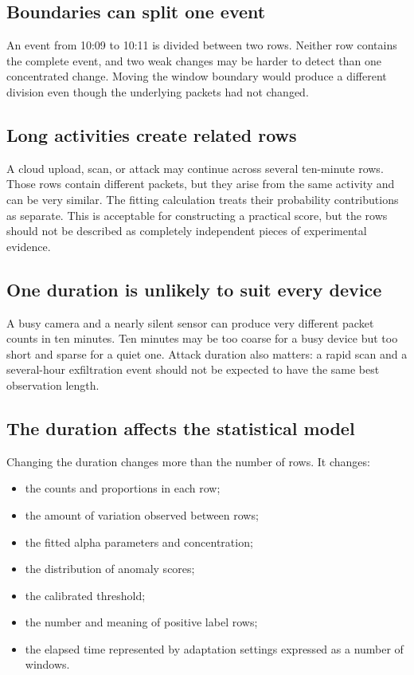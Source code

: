 \documentclass[11pt,a4paper]{article}
\begin{document}
\subsection{Boundaries can split one event}

An event from 10:09 to 10:11 is divided between two rows.  Neither row contains
the complete event, and two weak changes may be harder to detect than one
concentrated change.  Moving the window boundary would produce a different
division even though the underlying packets had not changed.

\subsection{Long activities create related rows}

A cloud upload, scan, or attack may continue across several ten-minute rows.
Those rows contain different packets, but they arise from the same activity and
can be very similar.  The fitting calculation treats their probability
contributions as separate.  This is acceptable for constructing a practical
score, but the rows should not be described as completely independent pieces
of experimental evidence.

\subsection{One duration is unlikely to suit every device}

A busy camera and a nearly silent sensor can produce very different packet
counts in ten minutes.  Ten minutes may be too coarse for a busy device but too
short and sparse for a quiet one.  Attack duration also matters: a rapid scan
and a several-hour exfiltration event should not be expected to have the same
best observation length.

\subsection{The duration affects the statistical model}

Changing the duration changes more than the number of rows.  It changes:

\begin{itemize}
  \item the counts and proportions in each row;
  \item the amount of variation observed between rows;
  \item the fitted alpha parameters and concentration;
  \item the distribution of anomaly scores;
  \item the calibrated threshold;
  \item the number and meaning of positive label rows;
  \item the elapsed time represented by adaptation settings expressed as a
        number of windows.
\end{itemize}
\end{document}

